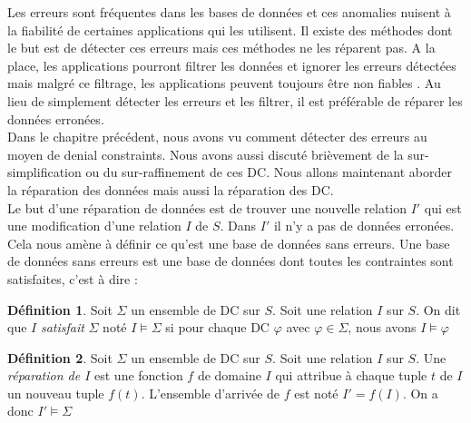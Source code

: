 \documentclass[letterpaper, 12pt]{report}
\theoremstyle{definition}
\newtheorem{mydef}{Définition}
\begin{document}
Les erreurs sont fréquentes dans les bases de données et ces anomalies nuisent à la fiabilité de certaines applications qui les utilisent. Il existe des méthodes dont le but est de détecter ces erreurs mais ces méthodes ne les réparent pas. A la place, les applications pourront filtrer les données et ignorer les erreurs détectées mais malgré ce filtrage, les applications peuvent toujours être non fiables \cite{anodetect}. Au lieu de simplement détecter les erreurs et les filtrer, il est préférable de réparer les données erronées.\\

Dans le chapitre précédent, nous avons vu comment détecter des erreurs au moyen de denial constraints. Nous avons aussi discuté brièvement de la sur-simplification ou du sur-raffinement de ces DC. Nous allons maintenant aborder la réparation des données mais aussi la réparation des DC.\\

%

Le but d'une réparation de données est de trouver une nouvelle relation $I'$ qui est une modification d'une relation $I$ de $S$. Dans $I'$ il n'y a pas de données erronées. Cela nous amène à définir ce qu'est une base de données sans erreurs. Une base de données sans erreurs est une base de données dont toutes les contraintes sont satisfaites, c'est à dire : \\

\begin{mydef}
	Soit $\Sigma$ un ensemble de DC sur $S$. Soit une relation $I$ sur $S$. On dit que $I$ \emph{satisfait} $\Sigma$ noté $I \models \Sigma$ si pour chaque DC $\varphi$ avec $\varphi \in \Sigma$, nous avons $I \models \varphi$
\end{mydef}

\begin{mydef}
	Soit $\Sigma$ un ensemble de DC sur $S$. Soit une relation $I$ sur $S$. Une \emph{réparation de $I$} est une fonction $f$ de domaine $I$ qui attribue à chaque tuple $t$ de $I$ un nouveau tuple $f(t)$. L'ensemble d'arrivée de $f$ est noté $I'=f(I)$. On a donc $I' \models \Sigma$
\end{mydef}
\end{document}
